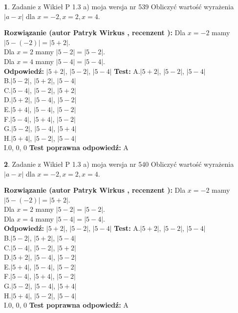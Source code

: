 \documentclass[12pt, a4paper]{article}
\theoremstyle{definition} %
\newtheorem{zad}{}
\newcommand{\zadStart}[1]{\begin{zad}#1\newline}
\newcommand{\zadStop}{\end{zad}}
\newcommand{\rozwStart}[2]{\noindent \textbf{Rozwiązanie (autor #1 , recenzent #2): }\newline}
\newcommand{\rozwStop}{\newline}
\newcommand{\odpStart}{\noindent \textbf{Odpowiedź:}\newline}
\newcommand{\odpStop}{\newline}
\newcommand{\testStart}{\noindent \textbf{Test:}\newline}
\newcommand{\testStop}{\newline}
\newcommand{\kluczStart}{\noindent \textbf{Test poprawna odpowiedź:}\newline}
\newcommand{\kluczStop}{\newline}
\begin{document}
\zadStart{Zadanie z Wikieł P 1.3 a) moja wersja nr 539}
Obliczyć wartość wyrażenia $|a - x|$ dla $x=-2,x=2,x=4$.
\zadStop
\rozwStart{Patryk Wirkus}{}
Dla $x = -2$ mamy $|5 - (-2)| = |5 + 2|$.\\
Dla $x = 2$ mamy $|5 - 2| = |5 - 2|$.\\
Dla $x = 4$ mamy $|5 - 4| = |5 - 4|$.\\
\rozwStop
\odpStart
$|5 + 2|$, $|5 - 2|$, $|5 - 4|$
\odpStop
\testStart
A.$|5 + 2|$, $|5 - 2|$, $|5 - 4|$\\
B.$|5 - 2|$, $|5 + 2|$, $|5 - 4|$\\
C.$|5 - 4|$, $|5 - 2|$, $|5 + 2|$\\
D.$|5 + 2|$, $|5 - 4|$, $|5 - 2|$\\
E.$|5 + 4|$, $|5 - 4|$, $|5 - 2|$\\
F.$|5 - 4|$, $|5 + 4|$, $|5 - 2|$\\
G.$|5 - 2|$, $|5 - 4|$, $|5 + 4|$\\
H.$|5 + 4|$, $|5 - 2|$, $|5 - 4|$\\
I.$0$, $0$, $0$
\testStop
\kluczStart
A
\kluczStop



\zadStart{Zadanie z Wikieł P 1.3 a) moja wersja nr 540}
Obliczyć wartość wyrażenia $|a - x|$ dla $x=-2,x=2,x=4$.
\zadStop
\rozwStart{Patryk Wirkus}{}
Dla $x = -2$ mamy $|5 - (-2)| = |5 + 2|$.\\
Dla $x = 2$ mamy $|5 - 2| = |5 - 2|$.\\
Dla $x = 4$ mamy $|5 - 4| = |5 - 4|$.\\
\rozwStop
\odpStart
$|5 + 2|$, $|5 - 2|$, $|5 - 4|$
\odpStop
\testStart
A.$|5 + 2|$, $|5 - 2|$, $|5 - 4|$\\
B.$|5 - 2|$, $|5 + 2|$, $|5 - 4|$\\
C.$|5 - 4|$, $|5 - 2|$, $|5 + 2|$\\
D.$|5 + 2|$, $|5 - 4|$, $|5 - 2|$\\
E.$|5 + 4|$, $|5 - 4|$, $|5 - 2|$\\
F.$|5 - 4|$, $|5 + 4|$, $|5 - 2|$\\
G.$|5 - 2|$, $|5 - 4|$, $|5 + 4|$\\
H.$|5 + 4|$, $|5 - 2|$, $|5 - 4|$\\
I.$0$, $0$, $0$
\testStop
\kluczStart
A
\kluczStop
\end{document}
